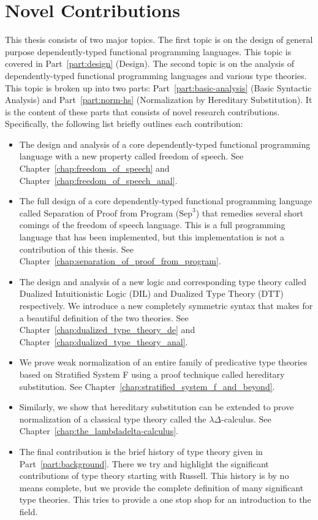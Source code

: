 \documentclass[phd,appendix,dedicationpage,ackpage,epigraphpage]{uithesis}
\newcommand{\Sep}[0]{\text{Sep}^3}
\begin{document}
\section{Novel Contributions}
\label{sec:novel_contributions}
This thesis consists of two major topics.  The first topic is on the
design of general purpose dependently-typed functional programming
languages. This topic is covered in Part~\ref{part:design} (Design).
The second topic is on the analysis of dependently-typed functional
programming languages and various type theories.  This topic is broken
up into two parts: Part~\ref{part:basic-analysis} (Basic Syntactic
Analysis) and Part~\ref{part:norm-hs} (Normalization by Hereditary
Substitution).  It is the content of these parts that consists of
novel research contributions. Specifically, the following list briefly
outlines each contribution:
\begin{itemize}
\item The design and analysis of a core dependently-typed functional
  programming language with a new property called freedom of
  speech. See Chapter~\ref{chap:freedom_of_speech} and
  Chapter~\ref{chap:freedom_of_speech_anal}.

\item The full design of a core dependently-typed functional
  programming language called Separation of Proof from Program ($\Sep$) that
  remedies several short comings of the freedom of speech language.
  This is a full programming language that has been implemented, but
  this implementation is not a contribution of this thesis.  See
  Chapter~\ref{chap:separation_of_proof_from_program}.

\item The design and analysis of a new logic and corresponding type
  theory called Dualized Intuitionistic Logic (DIL) and Dualized Type
  Theory (DTT) respectively. We introduce a new completely symmetric
  syntax that makes for a beautiful definition of the two theories.
  See Chapter~\ref{chap:dualized_type_theory_de} and
  Chapter~\ref{chap:dualized_type_theory_anal}.

\item We prove weak normalization of an entire family of predicative
  type theories based on Stratified System F using a proof technique
  called hereditary substitution. See
  Chapter~\ref{chap:stratified_system_f_and_beyond}.

\item Similarly, we show that hereditary substitution can be extended
  to prove normalization of a classical type theory called the
  $\lambda\Delta$-calculus. See
  Chapter~\ref{chap:the_lambdadelta-calculus}.

\item The final contribution is the brief history of type theory given
  in Part~\ref{part:background}.  There we try and highlight the
  significant contributions of type theory starting with Russell.
  This history is by no means complete, but we provide the complete
  definition of many significant type theories.  This tries to provide
  a one stop shop for an introduction to the field.
\end{itemize}
\end{document}
